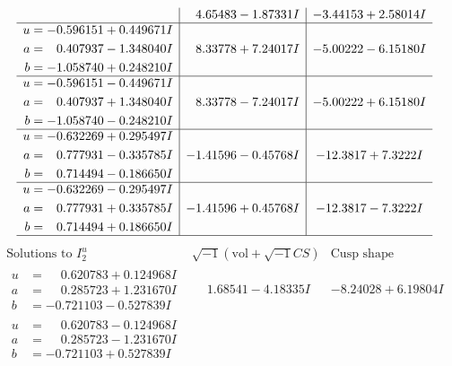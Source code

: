 \documentclass[1p]{elsarticle_modified}
\theoremstyle{definition}
\newcommand{\I}{\sqrt{-1}}
\begin{document}
$$\begin{array}{c|c|c}
 & \phantom{-}4.65483 - 1.87331 I & -3.44153 + 2.58014 I \\ \hline\begin{aligned}
u &= -0.596151 + 0.449671 I \\
a &= \phantom{-}0.407937 - 1.348040 I \\
b &= -1.058740 + 0.248210 I\end{aligned}
 & \phantom{-}8.33778 + 7.24017 I & -5.00222 - 6.15180 I \\ \hline\begin{aligned}
u &= -0.596151 - 0.449671 I \\
a &= \phantom{-}0.407937 + 1.348040 I \\
b &= -1.058740 - 0.248210 I\end{aligned}
 & \phantom{-}8.33778 - 7.24017 I & -5.00222 + 6.15180 I \\ \hline\begin{aligned}
u &= -0.632269 + 0.295497 I \\
a &= \phantom{-}0.777931 - 0.335785 I \\
b &= \phantom{-}0.714494 - 0.186650 I\end{aligned}
 & -1.41596 - 0.45768 I & -12.3817 + 7.3222 I \\ \hline\begin{aligned}
u &= -0.632269 - 0.295497 I \\
a &= \phantom{-}0.777931 + 0.335785 I \\
b &= \phantom{-}0.714494 + 0.186650 I\end{aligned}
 & -1.41596 + 0.45768 I & -12.3817 - 7.3222 I\\
 \hline 
 \end{array}$$\newpage$$\begin{array}{c|c|c}  
\text{Solutions to }I^u_{2}& \I (\text{vol} + \sqrt{-1}CS) & \text{Cusp shape}\\
 \hline 
\begin{aligned}
u &= \phantom{-}0.620783 + 0.124968 I \\
a &= \phantom{-}0.285723 + 1.231670 I \\
b &= -0.721103 - 0.527839 I\end{aligned}
 & \phantom{-}1.68541 - 4.18335 I & -8.24028 + 6.19804 I \\ \hline\begin{aligned}
u &= \phantom{-}0.620783 - 0.124968 I \\
a &= \phantom{-}0.285723 - 1.231670 I \\
b &= -0.721103 + 0.527839 I\end{aligned}

\end{array}$$
\end{document}
